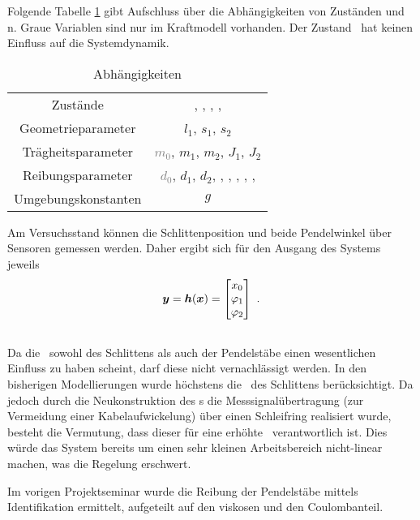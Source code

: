 Folgende Tabelle \ref{tab:abh} gibt Aufschluss über die Abhängigkeiten von Zuständen und \syp n. 
Graue Variablen sind nur im Kraftmodell vorhanden. 
Der Zustand \xo\ hat keinen Einfluss auf die Systemdynamik.
\begin{table}[h]
	\centering
		\begin{tabular}[t]{cc}
		\toprule
			Zustände	&	\textcolor{grey}{\xop}, \phe, \phep, \phz, \phzp	\\
			Geometrieparameter	&	$l_1$, $s_1$, $s_2$	\\
			Trägheitsparameter	&	\textcolor{grey}{$m_0$}, $m_1$, $m_2$, $J_1$, $J_2$ \\
			Reibungsparameter	&	\textcolor{grey}{$d_0$}, $d_1$, $d_2$, \textcolor{grey}{\Fco}, \Mceo, \Mczo, \textcolor{grey}{\xopth}, \pheth, \phzth	\\
			Umgebungskonstanten & $g$	\\
			\bottomrule
		\end{tabular}
	\caption{Abhängigkeiten}
	\label{tab:abh}
\end{table}


Am Versuchsstand können die Schlittenposition und beide Pendelwinkel über Sensoren gemessen werden. Daher ergibt sich für den Ausgang des Systems jeweils
\begin{align*}
	\boldsymbol{y} = \boldsymbol{h}(\boldsymbol{x}) = \begin{bmatrix}
		x_0 \\ \varphi_1 \\ \varphi_2
	\end{bmatrix}  \ .
\end{align*}



\subsection{\crb}

Da die \crb\ sowohl des Schlittens als auch der Pendelstäbe einen wesentlichen Einfluss zu haben scheint, darf diese nicht vernachlässigt werden. 
In den bisherigen Modellierungen wurde höchstens die \crb\ des Schlittens berücksichtigt. 
Da jedoch durch die Neukonstruktion des \dpd s die Messsignalübertragung (zur Vermeidung einer Kabelaufwickelung) über einen Schleifring realisiert wurde, besteht die Vermutung, dass dieser für eine erhöhte \crb\ verantwortlich ist. 
Dies würde das System bereits um einen sehr kleinen Arbeitsbereich nicht-linear machen, was die Regelung erschwert.

Im vorigen Projektseminar \cite{ribeiro} wurde die Reibung der Pendelstäbe mittels Identifikation ermittelt, aufgeteilt auf den viskosen und den Coulombanteil.

